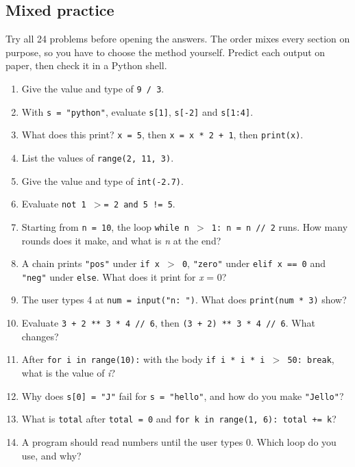 \documentclass[11pt]{article}
\begin{document}
\clearpage

\begin{keepsection}
\section{Mixed practice}

Try all 24 problems before opening the answers. The order mixes every section on purpose, so you have to choose the method yourself. Predict each output on paper, then check it in a Python shell.

\begin{enumerate}
\item Give the value and type of \texttt{9 / 3}.
\item With \texttt{s = "python"}, evaluate \texttt{s[1]}, \texttt{s[-2]} and \texttt{s[1:4]}.
\item What does this print? \texttt{x = 5}, then \texttt{x = x * 2 + 1}, then \texttt{print(x)}.
\item List the values of \texttt{range(2, 11, 3)}.
\item Give the value and type of \texttt{int(-2.7)}.
\item Evaluate \texttt{not 1 \ensuremath{>}= 2 and 5 != 5}.
\item Starting from \texttt{n = 10}, the loop \texttt{while n \ensuremath{>} 1: n = n // 2} runs. How many rounds does it make, and what is \textit{n} at the end?
\item A chain prints \texttt{"pos"} under \texttt{if x \ensuremath{>} 0}, \texttt{"zero"} under \texttt{elif x == 0} and \texttt{"neg"} under \texttt{else}. What does it print for \textit{x} = 0?
\item The user types 4 at \texttt{num = input("n: ")}. What does \texttt{print(num * 3)} show?
\item Evaluate \texttt{3 + 2 ** 3 * 4 // 6}, then \texttt{(3 + 2) ** 3 * 4 // 6}. What changes?
\item After \texttt{for i in range(10):} with the body \texttt{if i * i * i \ensuremath{>} 50: break}, what is the value of \textit{i}?
\item Why does \texttt{s[0] = "J"} fail for \texttt{s = "hello"}, and how do you make \texttt{"Jello"}?
\item What is \texttt{total} after \texttt{total = 0} and \texttt{for k in range(1, 6): total += k}?
\item A program should read numbers until the user types 0. Which loop do you use, and why?

\end{enumerate}
\end{keepsection}
\end{document}
